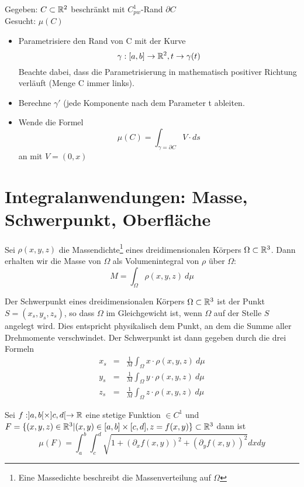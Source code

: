 \begin{concept}
    Gegeben: $C \subset \mathbb{R}^2$ beschränkt mit $C_{pw}^1$-Rand $\partial C$ \\
    Gesucht: $\mu(C)$
    \begin{itemize}
        \item Parametrisiere den Rand von C mit der Kurve $$\gamma : [a,b] \to \mathbb{R}^2, t \to \gamma(t)$$
        Beachte dabei, dass die Parametrisierung in mathematisch positiver Richtung verläuft (Menge C immer links).
        \item Berechne $\gamma'$ (jede Komponente nach dem Parameter t ableiten.
        \item Wende die Formel $$\mu(C) = \int_{\gamma = \partial C}V \cdot ds$$ an mit $V = (0,x)$
    \end{itemize}
\end{concept}

\section{Integralanwendungen: Masse, Schwerpunkt, Oberfläche}

\begin{remark}[Masse ($\R^3$)]
    Sei $\rho(x,y,z)$ die Massendichte\footnote{Eine Massedichte beschreibt die Massenverteilung auf $\Omega$} eines dreidimensionalen Körpers $\Omega \subset \mathbb{R}^3$. Dann erhalten wir die Masse von $\Omega$ als Volumenintegral von $\rho$ über $\Omega$:
    $$ M = \int_\Omega \rho(x,y,z) \: d\mu$$
\end{remark}

\begin{remark}[Schwerpunkt ($\R^3$)]
    Der Schwerpunkt eines dreidimensionalen Körpers $\Omega \subset \mathbb{R}^3$ ist der Punkt $S=(x_s, y_s, z_s)$, so dass $\Omega$ im Gleichgewicht ist, wenn $\Omega$ auf der Stelle $S$ angelegt wird. Dies entspricht physikalisch dem Punkt, an dem die Summe aller Drehmomente verschwindet. Der Schwerpunkt ist dann gegeben durch die drei Formeln
    \begin{eqnarray*}
        x_s & = & \frac{1}{M} \int_\Omega x \cdot \rho(x,y,z) \: d\mu \\
        y_s & = & \frac{1}{M} \int_\Omega y \cdot \rho(x,y,z) \: d\mu \\
        z_s & = & \frac{1}{M} \int_\Omega z \cdot \rho(x,y,z) \: d\mu 
    \end{eqnarray*}
\end{remark}

\begin{remark}[Oberfläche ($\R^3$)]
    Sei $f: ]a,b[ \times ]c,d[ \to \mathbb{R}$ eine stetige Funktion $\in C^1$ und $F = \{(x,y,z) \in \mathbb{R}^3 | (x,y) \in [a,b] \times [c,d], z = f(x,y)\} \subset \mathbb{R}^3$ dann ist $$ \mu(F) = \int_a^b \int_c^d \sqrt{1 + (\partial_x f(x,y))^2 + (\partial_y f(x,y))^2} dx dy $$
\end{remark}

    